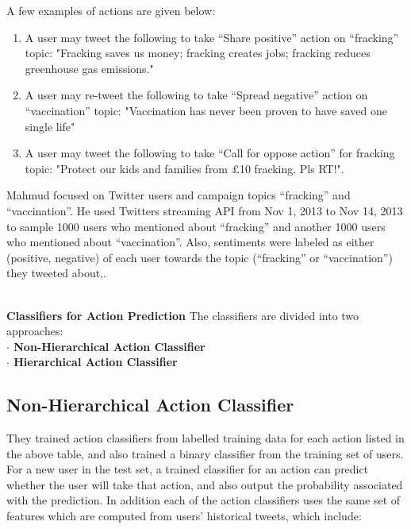 A few examples of actions are given below:
\begin{enumerate}
\item A user may tweet the following to take “Share positive” action on “fracking” topic:
"Fracking saves us money; fracking creates jobs; fracking reduces greenhouse gas
emissions."
\item A user may re-tweet the following to take “Spread negative” action on “vaccination”
topic: "Vaccination has never been proven to have saved one single life"
\item A user may tweet the following to take “Call for oppose action” for fracking topic:
"Protect our kids and families from \pounds10 fracking. Pls RT!".
\end{enumerate}
Mahmud focused on Twitter users and campaign topics “fracking” and “vaccination”. He used
Twitter\textquotesingle s streaming API from Nov 1, 2013 to Nov 14, 2013 to sample 1000 users who mentioned
about “fracking” and another 1000 users who mentioned about “vaccination”. Also, sentiments
were labeled as either (positive, negative) of each user towards the topic (“fracking” or
“vaccination”) they tweeted about,\cite{ref38}.

\leavevmode\\
\textbf{Classifiers for Action Prediction}
The classifiers are divided into two approaches:\\
\textbf{$\cdot$ Non-Hierarchical Action Classifier}\\
\textbf{$\cdot$ Hierarchical Action Classifier}

\subsection{Non-Hierarchical Action Classifier}
They trained action classifiers from labelled training data for each action listed in the above table, 
and also trained a binary classifier from the training set of users.\\
For a new user in the test set, a trained classifier for an action can predict whether the user will
take that action, and also output the probability associated with the prediction. In addition each of the action classifiers uses the same set of features which are computed from users' historical
tweets, which include:\\

